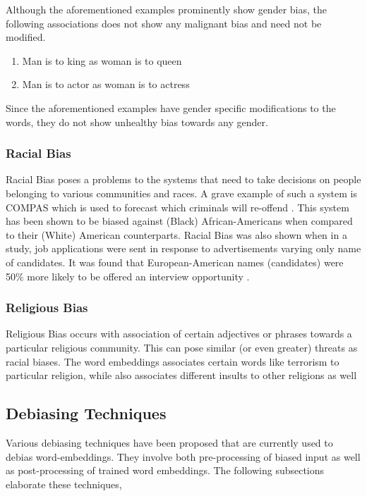 \documentclass[12pt, a4paper]{article}
\begin{document}
				Although the aforementioned examples prominently show gender bias, the following associations does not show any malignant bias and need not be modified.
				
				\begin{enumerate}
					\item Man is to king as woman is to queen
					\item Man is to actor as woman is to actress
				\end{enumerate}
				
				Since the aforementioned examples have gender specific modifications to the words, they do not show unhealthy bias towards any gender.
				
			
			\subsubsection{Racial Bias}
				Racial Bias poses a problems to the systems that need to take decisions on people belonging to various communities and races. A grave example of such a system is COMPAS which is used to forecast which criminals will re-offend \cite{9}. This system has been shown to be biased against (Black) African-Americans when compared to their (White) American counterparts. Racial Bias was also shown when in a study, job applications were sent in response to advertisements varying only name of candidates. It was found that European-American names (candidates) were 50\% more likely to be offered an interview opportunity \cite{10}.
				
			\subsubsection{Religious Bias}
				Religious Bias occurs with association of certain adjectives or phrases towards a particular religious community. This can pose similar (or even greater) threats as racial biases. The word embeddings associates certain words like terrorism to particular religion, while also associates different insults to other religions as well \cite{6}
		
		\subsection{Debiasing Techniques}
			Various debiasing techniques have been proposed that are currently used to debias word-embeddings. They involve both pre-processing of biased input as well as post-processing of trained word embeddings. The following subsections elaborate these techniques,
			
\end{document}
